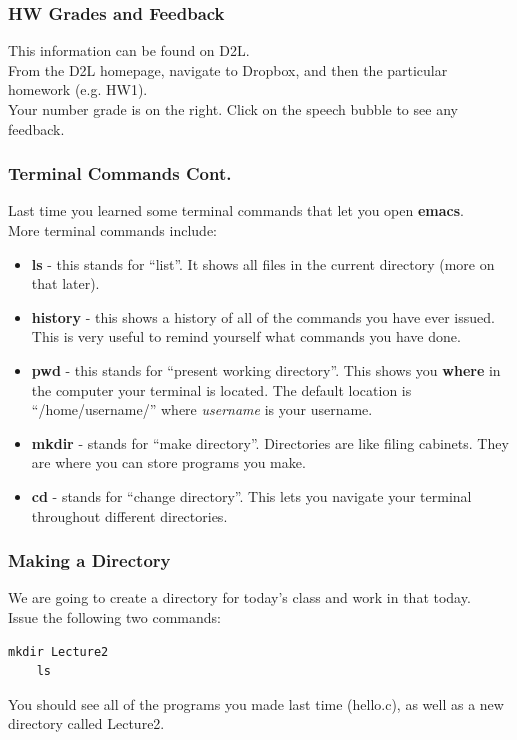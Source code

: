 \documentclass{beamer}
\begin{document}
\begin{frame}
  \frametitle{HW Grades and Feedback}
  This information can be found on D2L.\\
  From the D2L homepage, navigate to Dropbox, and then the 
  particular homework (e.g. HW1).\\
  Your number grade is on the right. Click on the speech bubble 
  to see any feedback.
\end{frame}

\begin{frame}
  \frametitle{Terminal Commands Cont.}
  Last time you learned some terminal commands that let you open 
  \textbf{emacs}.\\
  More terminal commands include:
  \begin{itemize}
    \item \textbf{ls} - this stands for ``list''. It shows all files in the 
      current directory (more on that later).
    \item \textbf{history} - this shows a history of all of 
      the commands you have ever issued.
      This is very useful to remind yourself what commands you have done.
    \item \textbf{pwd} - this stands for ``present working directory''. 
      This shows you 
      \textbf{where} in the computer your terminal is located. 
      The default location is 
      ``/home/username/'' where \textit{username} is your username.
    \item \textbf{mkdir} - stands for ``make directory''. 
      Directories are like filing 
      cabinets. They are where you can store programs you make.
    \item \textbf{cd} - stands for ``change directory''. 
      This lets you navigate your terminal throughout different directories.
  \end{itemize}
\end{frame}

\begin{frame}[fragile]
  \frametitle{Making a Directory}
  We are going to create a directory for today's class and work 
  in that today.\\
  Issue the following two commands:
  \begin{lstlisting}[style=custombash]
    mkdir Lecture2
    ls
  \end{lstlisting}
  You should see all of the programs you made last time (hello.c),
  as well as a new directory called Lecture2.
\end{frame}
\end{document}
